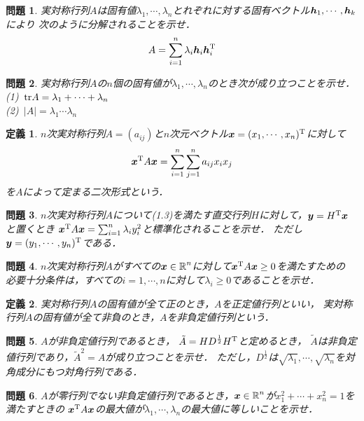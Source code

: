 \documentclass[11pt,ascmac]{jsarticle}
\newtheorem{df}{\bf 定義}[section]
\newtheorem{pr}{\bf 問題}[section]
\newcommand{\R}{\mbox{${\mathbb R}$}}
\newcommand{\vx}{\mbox{{\boldmath $x$}}}
\newcommand{\vy}{\mbox{{\boldmath $y$}}}
\newcommand{\vh}{\mbox{{\boldmath $h$}}}
\begin{document}
\begin{pr}
実対称行列$A$は固有値$\lambda_1,\cdots,\lambda_n$とれぞれに対する固有ベクトル$\vh_1,\cdots,\vh_k$により
次のように分解されることを示せ．
\begin{equation}
A=\sum_{i=1}^n \lambda_i \vh_i\vh_i^{\rm T}
\end{equation}
\end{pr}


\begin{pr}
実対称行列$A$の$n$個の固有値が$\lambda_1,\cdots,\lambda_n$のとき次が成り立つことを示せ．\\
(1)~${\rm tr}A=\lambda_1+\cdots+\lambda_n$\\
(2)~$|A|=\lambda_1\cdots\lambda_n$
\end{pr}

\begin{df}
$n$次実対称行列$A=(a_{ij})$と$n$次元ベクトル$\vx=(x_1,\cdots,x_n)^{\rm T}$に対して
\begin{equation}
\vx^{\rm T}A\vx=\sum_{i=1}^n\sum_{j=1}^n a_{ij}x_ix_j
\end{equation}
を$A$によって定まる二次形式という．
\end{df}

\begin{pr}
$n$次実対称行列$A$について(1.3)を満たす直交行列$H$に対して，$\vy=H^{\rm T}\vx$と置くとき
$\vx^{\rm T}A\vx=\sum_{i=1}^n \lambda_{i}y_i^2$と標準化されることを示せ．
ただし$\vy=(y_1,\cdots,y_n)^{\rm T}$である．
\end{pr}

\begin{pr}
$n$次実対称行列$A$がすべての$\vx \in \R^n$に対して$\vx^{\rm T}A\vx\geq0$を満たすための
必要十分条件は，すべての$i =1,\cdots,n$に対して$\lambda_i\geq 0$であることを示せ．
\end{pr}

\begin{df}
実対称行列$A$の固有値が全て正のとき，$A$を正定値行列といい，
実対称行列$A$の固有値が全て非負のとき，$A$を非負定値行列という．
\end{df}

\begin{pr}
$A$が非負定値行列であるとき，
$\tilde{A}=HD^{\frac12}H^{\rm T}$と定めるとき，
$\tilde{A}$は非負定値行列であり，$\tilde{A}^2=A$が成り立つことを示せ．
ただし，$D^{\frac12}$は$\sqrt{\lambda_1},\cdots,\sqrt{\lambda_n}$を対角成分にもつ対角行列である．
\end{pr}

\begin{pr}
$A$が零行列でない非負定値行列であるとき，$\vx \in \R^n$が$x_1^2+\cdots+x_n^2=1$を満たすときの
$\vx^{\rm T}A\vx$の最大値が$\lambda_1,\cdots,\lambda_n$の最大値に等しいことを示せ．
\end{pr}
\end{document}
